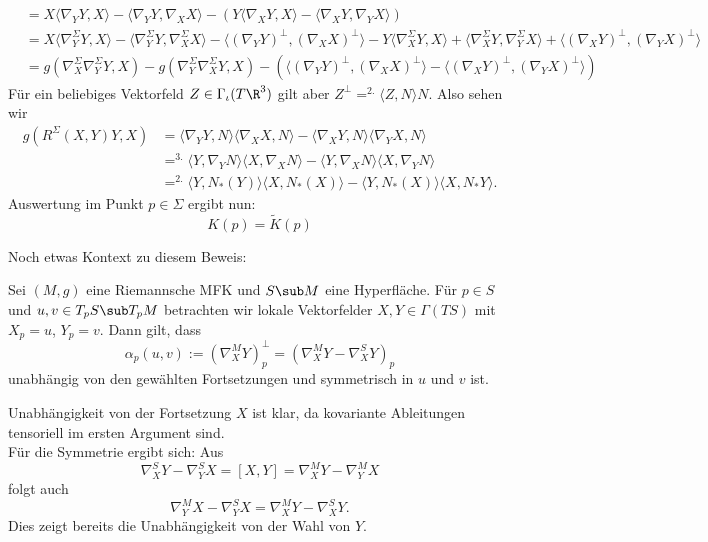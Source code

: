 \begin{beweis}
\begin{align}
&= X \langle \nabla_Y Y, X \rangle - \langle \nabla_YY, \nabla_XX \rangle - \left( Y \langle \nabla_XY, X\rangle - \langle \nabla_XY, \nabla_YX \rangle \right)\\
&= X \langle \nabla_Y^\Sigma Y, X \rangle - \langle \nabla_Y^\Sigma Y, \nabla_X^\Sigma X \rangle- \langle (\nabla_Y Y)^{\perp}, (\nabla_X X)^{\perp} \rangle - Y \langle \nabla_X^\Sigma  Y, X \rangle + \langle \nabla_X^\Sigma Y, \nabla_Y^\Sigma X \rangle + \langle (\nabla_XY)^{\perp}, (\nabla_YX)^{\perp} \rangle\\
&= g(\nabla_X^\Sigma \nabla_Y^\Sigma Y, X) - g(\nabla_Y^\Sigma \nabla_X^\Sigma Y, X) - \left( \langle (\nabla_YY)^{\perp},(\nabla_XX)^{\perp} \rangle - \langle (\nabla_XY)^{\perp}, (\nabla_YX)^{\perp} \rangle \right)
\end{align}
Für ein beliebiges Vektorfeld $Z \in \Gamma_\iota (T\R^3)$ gilt aber $Z^{\perp} =^{2.} \langle Z,N\rangle N$. Also sehen wir
\begin{align}
g(R^\Sigma(X,Y)Y,X) &= \langle  \nabla_YY,N\rangle \langle \nabla_XX, N\rangle - \langle \nabla_XY,N \rangle \langle \nabla_YX,N \rangle\\
&=^{3.}  \langle Y, \nabla_Y N \rangle \langle X, \nabla_X N \rangle - \langle Y, \nabla_X N \rangle \langle X, \nabla_Y N \rangle\\
&=^{2.} \langle Y, N_\ast(Y) \rangle \langle X, N_\ast(X) \rangle - \langle Y, N_\ast (X) \rangle \langle X, N_\ast Y \rangle.
\end{align}
Auswertung im Punkt $p \in \Sigma$ ergibt nun: 
\begin{equation}
K(p) = \tilde{K}(p)
\end{equation}
\end{beweis}
Noch etwas Kontext zu diesem Beweis: 
\begin{satz}{}{}
Sei $(M,g)$ eine Riemannsche MFK und $S \sub M$ eine Hyperfläche. Für $p \in S$ und $u,v \in T_pS \sub T_pM$ betrachten wir lokale Vektorfelder $X,Y \in \Gamma(TS)$ mit $X_p = u$, $Y_p =v$. Dann gilt, dass 
\begin{equation}
\alpha_p(u,v) := (\nabla_X^MY)_p^{\perp} = \left( \nabla_X^M Y - \nabla_X^S Y \right)_p
\end{equation}
unabhängig von den gewählten Fortsetzungen und symmetrisch in $u$ und $v$ ist.
\end{satz}
\begin{beweis}
Unabhängigkeit von der Fortsetzung $X$ ist klar, da kovariante Ableitungen tensoriell im ersten Argument sind.\\
Für die Symmetrie ergibt sich:
Aus
\begin{equation}
\nabla_X^S Y-\nabla_Y^S X = [X,Y] = \nabla_X^M Y - \nabla_Y^M X
\end{equation}
folgt auch 
\begin{equation}
\nabla_Y^MX-\nabla_Y^SX = \nabla_X^MY-\nabla_X^S Y.
\end{equation}
Dies zeigt bereits die Unabhängigkeit von der Wahl von $Y$.
\end{beweis}
